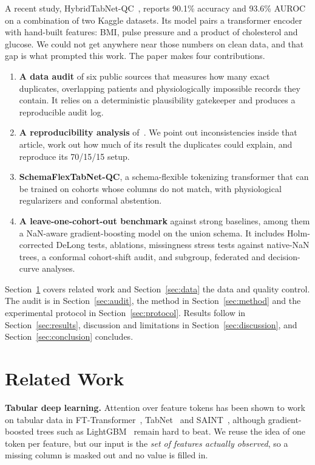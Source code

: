 \documentclass[conference]{IEEEtran}
\newcommand{\sfn}{SchemaFlexTabNet-QC}
\newcommand{\htn}{HybridTabNet-QC}
\begin{document}
A recent study, \htn{}~\cite{mahmud2026}, reports 90.1\% accuracy and 93.6\% AUROC on a combination of two Kaggle datasets. Its model pairs a transformer encoder with hand-built features: BMI, pulse pressure and a product of cholesterol and glucose. We could not get anywhere near those numbers on clean data, and that gap is what prompted this work. The paper makes four contributions.
\begin{enumerate}
\item \textbf{A data audit} of six public sources that measures how many exact duplicates, overlapping patients and physiologically impossible records they contain. It relies on a deterministic plausibility gatekeeper and produces a reproducible audit log.
\item \textbf{A reproducibility analysis} of~\cite{mahmud2026}. We point out inconsistencies inside that article, work out how much of its result the duplicates could explain, and reproduce its 70/15/15 setup.
\item \textbf{\sfn{}}, a schema-flexible tokenizing transformer that can be trained on cohorts whose columns do not match, with physiological regularizers and conformal abstention.
\item \textbf{A leave-one-cohort-out benchmark} against strong baselines, among them a NaN-aware gradient-boosting model on the union schema. It includes Holm-corrected DeLong tests, ablations, missingness stress tests against native-NaN trees, a conformal cohort-shift audit, and subgroup, federated and decision-curve analyses.
\end{enumerate}
Section~\ref{sec:related} covers related work and Section~\ref{sec:data} the data and quality control. The audit is in Section~\ref{sec:audit}, the method in Section~\ref{sec:method} and the experimental protocol in Section~\ref{sec:protocol}. Results follow in Section~\ref{sec:results}, discussion and limitations in Section~\ref{sec:discussion}, and Section~\ref{sec:conclusion} concludes.

\section{Related Work}\label{sec:related}
\textbf{Tabular deep learning.} Attention over feature tokens has been shown to work on tabular data in FT-Transformer~\cite{gorishniy2021}, TabNet~\cite{arik2021} and SAINT~\cite{somepalli2021}, although gradient-boosted trees such as LightGBM~\cite{ke2017} remain hard to beat. We reuse the idea of one token per feature, but our input is the \emph{set of features actually observed}, so a missing column is masked out and no value is filled in.
\end{document}
